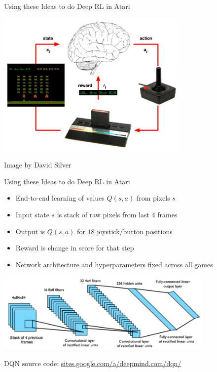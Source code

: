 \begin{frame}[c]{Using these Ideas to do Deep RL in Atari}
	
\centering
\includegraphics[width=0.7\textwidth]{images/atari_deep_rl.png}

\begin{flushright}
	\small
	Image by David Silver
\end{flushright}
	
\end{frame}
\begin{frame}[c]{Using these Ideas to do Deep RL in Atari}
	
\begin{itemize}
	\item End-to-end learning of values $Q(s, a)$ from pixels $s$
	\item Input state $s$ is stack of raw pixels from last $4$ frames
	\item Output is $Q(s, a)$ for $18$ joystick/button positions
	\item Reward is change in score for that step
	\item Network architecture and hyperparameters fixed across all games
\end{itemize}

\centering
\includegraphics[width=0.8\textwidth]{images/atari_dqn_arch.png}

\begin{flushright}
	\footnotesize
	\vspace{-0.1cm}
	DQN source code: \url{sites.google.com/a/deepmind.com/dqn/}
\end{flushright}
	
\end{frame}
